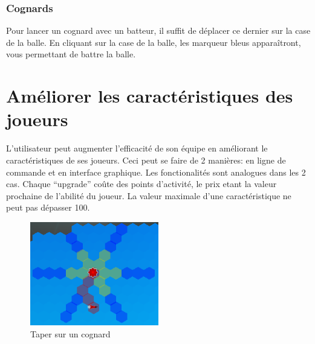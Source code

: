 \subsubsection{Cognards}
Pour lancer un cognard avec un batteur, il suffit de déplacer ce dernier sur la case de la balle. En cliquant sur la case de la balle, les marqueur bleus apparaîtront, vous permettant de battre la balle.

\section{Améliorer les caractéristiques des joueurs}
L’utilisateur peut augmenter l’efficacité de son équipe en améliorant le caractéristiques de ses joueurs. Ceci peut se faire de 2 manières: en ligne de commande et en interface graphique.
Les fonctionalités sont analogues dans les 2 cas. Chaque “upgrade” coûte des points d’activité, le prix etant la valeur prochaine de l’abilité du joueur. 
La valeur maximale d’une caractéristique ne peut pas dépasser  100.
\begin{figure}[h!]
    \centering
    \includegraphics[width=0.5\textwidth]{../screenshots/throw_bludger.png}
    \caption{\label{manual:throw_bludger} Taper sur un cognard}
\end{figure}

